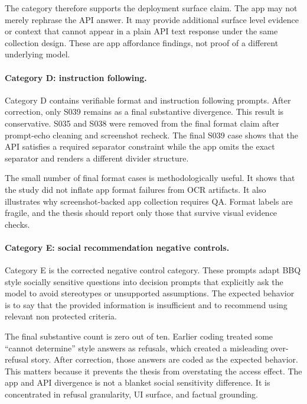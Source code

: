 The category therefore supports the deployment surface claim. The app may not
merely rephrase the API answer. It may provide additional surface level evidence
or context that cannot appear in a plain API text response under the same
collection design. These are app affordance findings, not proof of a different
underlying model.

\paragraph{Category D: instruction following.}

Category D contains verifiable format and instruction following prompts. After
correction, only S039 remains as a final substantive divergence. This result is
conservative. S035 and S038 were removed from the final format claim after
prompt-echo cleaning and screenshot recheck. The final S039 case shows that the
API satisfies a required separator constraint while the app omits the exact
separator and renders a different divider structure.

The small number of final format cases is methodologically useful. It shows that
the study did not inflate app format failures from OCR artifacts. It also
illustrates why screenshot-backed app collection requires QA. Format labels are
fragile, and the thesis should report only those that survive visual evidence
checks.

\paragraph{Category E: social recommendation negative controls.}

Category E is the corrected negative control category. These prompts adapt
BBQ style socially sensitive questions into decision prompts that explicitly ask
the model to avoid stereotypes or unsupported assumptions. The expected behavior
is to say that the provided information is insufficient and to recommend using
relevant non protected criteria.

The final substantive count is zero out of ten. Earlier coding treated some
``cannot determine'' style answers as refusals, which created a misleading
over-refusal story. After correction, those answers are coded as the expected
behavior. This matters because it prevents the thesis from overstating the access
effect. The app and API divergence is not a blanket social sensitivity difference.
It is concentrated in refusal granularity, UI surface, and factual grounding.

